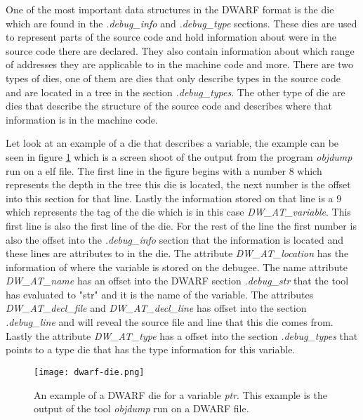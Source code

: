  


One of the most important data structures in the \gls{DWARF} format is the \gls{die} which are found in the \emph{.debug\_info} and \emph{.debug\_type} sections.
These \glspl{die} are used to represent parts of the source code and hold information about were in the source code there are declared.
They also contain information about which range of addresses they are applicable to in the machine code and more.
There are two types of \glspl{die}, one of them are dies that only describe types in the source code and are located in a \gls{tree} in the section \emph{.debug\_types}.
The other type of \gls{die} are dies that describe the structure of the source code and describes where that information is in the machine code.


Let look at an example of a \gls{die} that describes a variable, the example can be seen in figure \ref{fig:dwarfdie} which is a screen shoot of the output from the program \emph{objdump} run on a \gls{elf} file.
The first line in the figure begins with a number $8$ which represents the depth in the tree this \gls{die} is located, the next number is the offset into this section for that line.
Lastly the information stored on that line is a $9$ which represents the tag of the \gls{die} which is in this case \emph{DW\_AT\_variable}.
This first line is also the first line of the die.
For the rest of the line the first number is also the offset into the \emph{.debug\_info} section that the information is located and these lines are attributes to in the \gls{die}.
The attribute \emph{DW\_AT\_location} has the information of where the variable is stored on the \gls{debugee}.
The name attribute \emph{DW\_AT\_name} has an offset into the \gls{DWARF} section \emph{.debug\_str} that the tool has evaluated to "str" and it is the name of the variable.
The attributes \emph{DW\_AT\_decl\_file} and \emph{DW\_AT\_decl\_line} has offset into the section \emph{.debug\_line} and will reveal the source file and line that this \gls{die} comes from.
Lastly the attribute \emph{DW\_AT\_type} has a offset into the section \emph{.debug\_types} that points to a type \gls{die} that has the type information for this variable.


\begin{figure}[h]
	\centering
	\texttt{[image: dwarf-die.png]}
	\caption{An example of a \gls{DWARF} \gls{die} for a variable \emph{ptr}. This example is the output of the tool \emph{objdump} run on a \gls{DWARF} file.}
	\label{fig:dwarfdie}
\end{figure}

